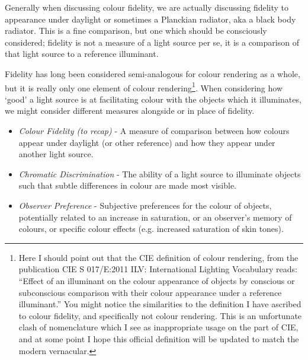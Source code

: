 Generally when discussing colour fidelity, we are actually discussing fidelity to appearance under daylight or sometimes a Planckian radiator, aka a black body radiator. This is a fine comparison, but one which should be consciously considered; fidelity is not a measure of a light source per se, it is a comparison of that light source to a reference illuminant.

Fidelity has long been considered semi-analogous for colour rendering as a whole, but it is really only one element of colour rendering\footnote{Here I should point out that the \gls{CIE} definition of colour rendering, from the publication \gls{CIE} S 017/E:2011 ILV: International Lighting Vocabulary \citep{cie_cie_2011} reads: ``Effect of an illuminant on the colour appearance of objects by conscious or subconscious comparison with their colour appearance under a reference illuminant.'' You might notice the similarities to the definition I have ascribed to colour fidelity, and specifically not colour rendering. This is an unfortunate clash of nomenclature which I see as inappropriate usage on the part of \gls{CIE}, and at some point I hope this official definition will be updated to match the modern vernacular.}. When considering how `good' a light source is at facilitating colour with the objects which it illuminates, we might consider different measures alongside or in place of fidelity.

\begin{itemize}
\item \emph{Colour Fidelity (to recap)} - A measure of comparison between how colours appear under daylight (or other reference) and how they appear under another light source. %
\item \emph{Chromatic Discrimination} - The ability of a light source to illuminate objects such that subtle differences in colour are made most visible. %
\item \emph{Observer Preference} - Subjective preferences for the colour of objects, potentially related to an increase in saturation, or an observer's memory of colours, or specific colour effects (e.g. increased saturation of skin tones). %
\end{itemize}

